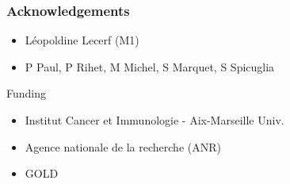 \documentclass{beamer}
\newcommand*{\floatRelativePath}{../out/gwas417/pval_5e-08/r2_0.1/kb_1000/window_1000000/75_50}%
\begin{document}
    \begin{frame}
        \frametitle{Acknowledgements}

        \begin{itemize}
            \item L\'eopoldine Lecerf (M1)
            \item P Paul, P Rihet, M Michel, S Marquet, S Spicuglia
        \end{itemize}
%
        \vfill
%
        Funding
%
        \begin{itemize}
            \item Institut Cancer et Immunologie - Aix-Marseille Univ.
            \item Agence nationale de la recherche (ANR)
            \item GOLD
        \end{itemize}

    \end{frame}

    \begin{frame}
        \frametitle{}

    \end{frame}

%
%
\end{document}
